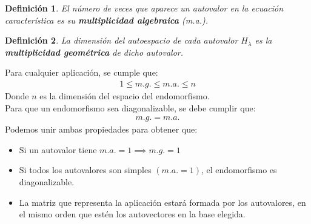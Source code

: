 \documentclass{article}
\newtheorem{defin}{Definición}
\begin{document}
\begin{defin}
    El número de veces que aparece un autovalor en la ecuación característica es su
    \textbf{multiplicidad algebraica} (m.a.).
\end{defin}
\begin{defin}
    La dimensión del autoespacio de cada autovalor $H_{\lambda }$ es la \textbf{multiplicidad geométrica}
    de dicho autovalor.
\end{defin}
Para cualquier aplicación, se cumple que:
\begin{equation}
    \begin{split}
        \boxed{1 \le m.g. \le m.a. \le n}
    \end{split}
\end{equation}
Donde $n$ es la dimensión del espacio del endomorfismo.\\
Para que un endomorfismo sea diagonalizable, se debe cumplir que:
\begin{equation}
    \begin{split}
        m.g. = m.a.
    \end{split}
\end{equation}
Podemos unir ambas propiedades para obtener que:
\begin{itemize}
    \item Si un autovalor tiene $m.a. = 1 \implies m.g. = 1$
    \item Si todos los autovalores son simples $(m.a.=1)$, el endomorfismo es diagonalizable.
    \item La matriz que representa la aplicación estará formada por los autovalores, en el mismo orden que estén los
    autovectores en la base elegida.
\end{itemize}
\end{document}
